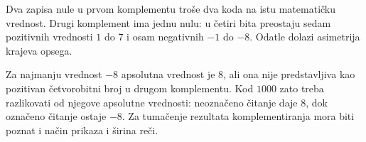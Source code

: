 
Dva zapisa nule u prvom komplementu troše dva koda na istu matematičku vrednost. Drugi komplement ima jednu nulu: u četiri bita preostaju sedam pozitivnih vrednosti $1$ do $7$ i osam negativnih $-1$ do $-8$. Odatle dolazi asimetrija krajeva opsega.

Za najmanju vrednost $-8$ apsolutna vrednost je $8$, ali ona nije predstavljiva kao pozitivan četvorobitni broj u drugom komplementu. Kod $1000$ zato treba razlikovati od njegove apsolutne vrednosti: neoznačeno čitanje daje $8$, dok označeno čitanje ostaje $-8$. Za tumačenje rezultata komplementiranja mora biti poznat i način prikaza i širina reči.
